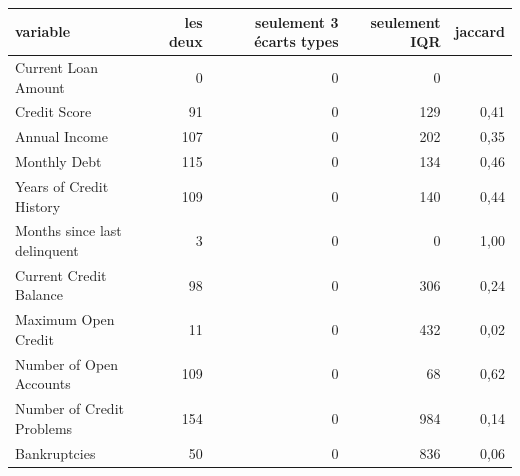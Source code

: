 \begin{tabular}{lrrrr}
\toprule
\textbf{variable} & \textbf{les deux} & \textbf{seulement 3 écarts types} & \textbf{seulement IQR} & \textbf{jaccard} \\
\midrule
Current Loan Amount & 0 & 0 & 0 &  \\
Credit Score & 91 & 0 & 129 & 0,41 \\
Annual Income & 107 & 0 & 202 & 0,35 \\
Monthly Debt & 115 & 0 & 134 & 0,46 \\
Years of Credit History & 109 & 0 & 140 & 0,44 \\
Months since last delinquent & 3 & 0 & 0 & 1,00 \\
Current Credit Balance & 98 & 0 & 306 & 0,24 \\
Maximum Open Credit & 11 & 0 & 432 & 0,02 \\
Number of Open Accounts & 109 & 0 & 68 & 0,62 \\
Number of Credit Problems & 154 & 0 & 984 & 0,14 \\
Bankruptcies & 50 & 0 & 836 & 0,06 \\
\bottomrule
\end{tabular}
